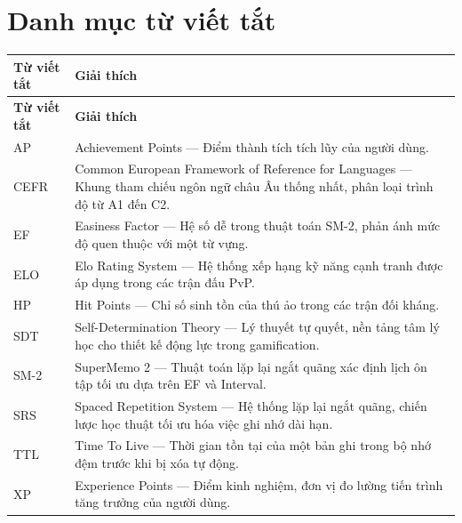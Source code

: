 
\chapter*{Danh mục từ viết tắt}

\renewcommand{\arraystretch}{1.35}
\begin{longtable}{p{3.2cm} p{10.8cm}}
\hline
\textbf{Từ viết tắt} & \textbf{Giải thích} \\
\hline
\endfirsthead
\hline
\textbf{Từ viết tắt} & \textbf{Giải thích} \\
\hline
\endhead
\hline
\endfoot

AP      & Achievement Points — Điểm thành tích tích lũy của người dùng. \\
CEFR    & Common European Framework of Reference for Languages — Khung tham chiếu ngôn ngữ châu Âu thống nhất, phân loại trình độ từ A1 đến C2. \\
EF      & Easiness Factor — Hệ số dễ trong thuật toán SM-2, phản ánh mức độ quen thuộc với một từ vựng. \\
ELO     & Elo Rating System — Hệ thống xếp hạng kỹ năng cạnh tranh được áp dụng trong các trận đấu PvP. \\
HP      & Hit Points — Chỉ số sinh tồn của thú ảo trong các trận đối kháng. \\
SDT     & Self-Determination Theory — Lý thuyết tự quyết, nền tảng tâm lý học cho thiết kế động lực trong gamification. \\
SM-2    & SuperMemo 2 — Thuật toán lặp lại ngắt quãng xác định lịch ôn tập tối ưu dựa trên EF và Interval. \\
SRS     & Spaced Repetition System — Hệ thống lặp lại ngắt quãng, chiến lược học thuật tối ưu hóa việc ghi nhớ dài hạn. \\
TTL     & Time To Live — Thời gian tồn tại của một bản ghi trong bộ nhớ đệm trước khi bị xóa tự động. \\
XP      & Experience Points — Điểm kinh nghiệm, đơn vị đo lường tiến trình tăng trưởng của người dùng. \\


\end{longtable}
